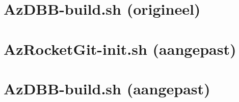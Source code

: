 \documentclass[dutch,dit,thesis]{hogentreport}
\begin{document}
\autocite{IBM2021b}

\pagebreak
\section{AzDBB-build.sh (origineel)}
\label{sec:dbbbuildorig}

    
\autocite{IBM2021b}

\pagebreak
\section{AzRocketGit-init.sh (aangepast)}
\label{sec:gitinit}


\pagebreak
\section{AzDBB-build.sh (aangepast)}
\label{sec:dbbbuild}


\pagebreak


\backmatter{}

\setlength\bibitemsep{2pt} %
\printbibliography[heading=bibintoc]
\end{document}
